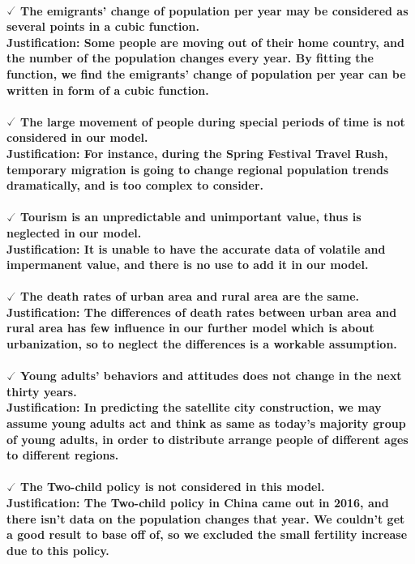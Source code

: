 \documentclass{article}
\begin{document}
\paragraph{$\checked$ The emigrants' change of population per year may be considered as several points in a cubic function. \\
Justification: Some people are moving out of their home country, and the number of the population changes every year. By fitting the function, we find the emigrants' change of population per year can be written in form of a cubic function. }
\paragraph{$\checked$ The large movement of people during special periods of time is not considered in our model. \\
Justification: For instance, during the Spring Festival Travel Rush, temporary migration is going to change regional population trends dramatically, and is too complex to consider.}
\paragraph{$\checked$ Tourism is an unpredictable and unimportant value, thus is neglected in our model. \\
Justification: It is unable to have the accurate data of volatile and impermanent value, and there is no use to add it in our model. }
\paragraph{$\checked$ The death rates of urban area and rural area are the same. \\
Justification: The differences of death rates between urban area and rural area has few influence in our further model which is about urbanization, so to neglect the differences is a workable assumption. }
\paragraph{$\checked$ Young adults' behaviors and attitudes does not change in the next thirty years. \\
Justification: In predicting the satellite city construction, we may assume young adults act and think as same as today's majority group of young adults, in order to distribute arrange people of different ages to different regions. }
\paragraph{$\checked$ The Two-child policy is not considered in this model. \\
Justification: The Two-child policy in China came out in 2016, and there isn't data on the population changes that year. We couldn't get a good result to base off of, so we excluded the small fertility increase due to this policy.}
\end{document}

